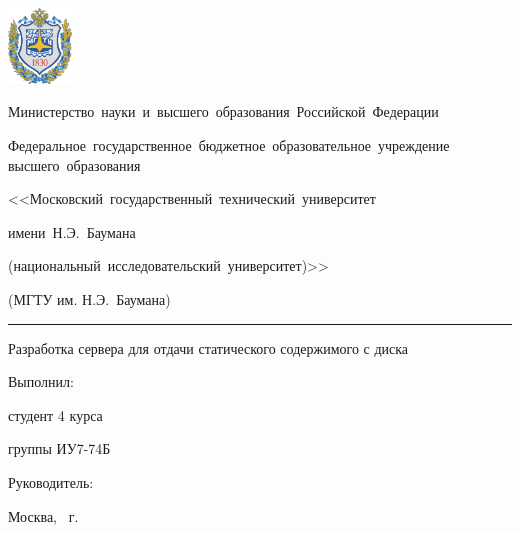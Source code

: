 \documentclass[gray]{beamer}
\begin{document}
\begingroup
{}
\begin{frame}
    \begin{minipage}{0.1\textwidth}
        \includegraphics[width=1.7cm]{img/bmstu.pdf}
    \end{minipage}
    \hfill
    \begin{minipage}{0.8\textwidth}\centering\bfseries
        {
            \linespread{1}\selectfont\tiny
            \vspace{0.1cm}
            {Министерство~науки~и~высшего~образования~Российской~Федерации}

            {Федеральное~государственное~бюджетное~образовательное~учреждение высшего~образования}

            {
                <<Московский~государственный~технический~университет

                имени~Н.Э.~Баумана

                (национальный~исследовательский~университет)>>
            }

            {(МГТУ им. Н.Э.~Баумана)}
            \vspace{0.1cm}
        }
    \end{minipage}

    \vspace{0.2cm}
    \rule[3ex]{\linewidth}{1pt}

    \vfill

    \begin{center}
    \Large Разработка сервера для отдачи статического содержимого с диска
    \end{center}

    \vfill

    \begin{minipage}[t]{0.45\textwidth}
        \small
        \raggedright
        Выполнил:

        студент 4 курса

        группы ИУ7-74Б

    \end{minipage}
    \hfill
    \begin{minipage}[t]{0.45\textwidth}
        \small
        \raggedleft
        Руководитель:

    \end{minipage}

    \vfill

    \begin{center}
        Москва, \the\year\ г.
    \end{center}
\end{frame}
\endgroup
\end{document}
